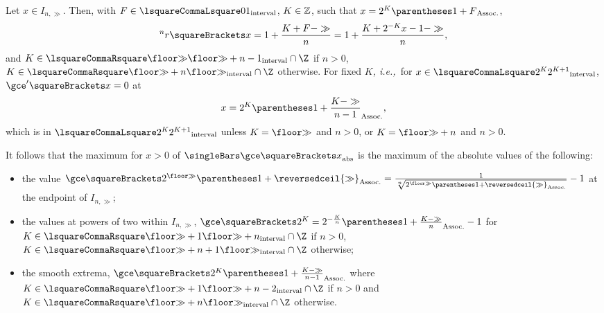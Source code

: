 \documentclass[10pt, a4paper, twoside]{basestyle}
\newcommand{\idest}{\emph{, i.e.,\ }}
\newcommand{\ApproximateRoot}[1]{{{}^{#1}r}}
\newcommand\ModOne[1]{\reversedceil{#1}}
\begin{document}
Let $x\in I_{n,\gg}$.
Then, with $F\in\intclop 0 1$, $K\in\mathbb{Z}$, such that $x=2^K\pa{1+F}$,
\[
\ApproximateRoot{n}\of{x} = 1+\frac{K+F-\gg}{n} = 1+\frac{K+2^{-K}x-1-\gg}{n}\text,
\]
and $K\in \intclos{\Floor{\gg}}{\Floor{\gg}+n-1}\Intersection\Z$ if $n>0$,
$K\in \intclos{\Floor{\gg}+n}{\Floor{\gg}}\Intersection\Z$ otherwise.
For fixed $K$\idest for $x\in\intclop{2^K}{2^{K+1}}$,
$\gce\der\of{x}=0$ at \[
x=2^K\pa{1+\frac{K-\gg}{n-1}}\text,
\]
which is in $\intclop{2^K}{2^{K+1}}$ unless $K=\Floor{\gg}$ and $n>0$, or $K=\Floor{\gg}+n$ and $n>0$.

It follows that the maximum for $x>0$ of $\abs{\gce\of{x}}$ is the maximum of the absolute values of the
following:
\begin{itemize}
\item the value $\gce\of{2^{\Floor{\gg}}\pa{1+\ModOne{\gg}}}=
\frac{1}{\sqrt[n]{2^{\Floor{\gg}}\pa{1+\ModOne{\gg}}}}-1$ at the endpoint of $I_{n,\gg}$;
\item the values at powers of two within $I_{n,\gg}$,
$\gce\of{2^K}=2^{-\frac{K}{n}}\pa{1+\frac{K-\gg}{n}}-1$ for
$K\in \intclos{\Floor{\gg}+1}{\Floor{\gg}+n}\Intersection\Z$ if $n>0$,
$K\in \intclos{\Floor{\gg}+n+1}{\Floor{\gg}}\Intersection\Z$ otherwise;
\item the smooth extrema, $\gce\of{2^K\pa{1+\frac{K-\gg}{n-1}}}$ where
$K\in \intclos{\Floor{\gg}+1}{\Floor{\gg}+n-2}\Intersection\Z$ if $n>0$ and
$K\in \intclos{\Floor{\gg}+n}{\Floor{\gg}}\Intersection\Z$ otherwise.
\end{itemize}
\end{document}
